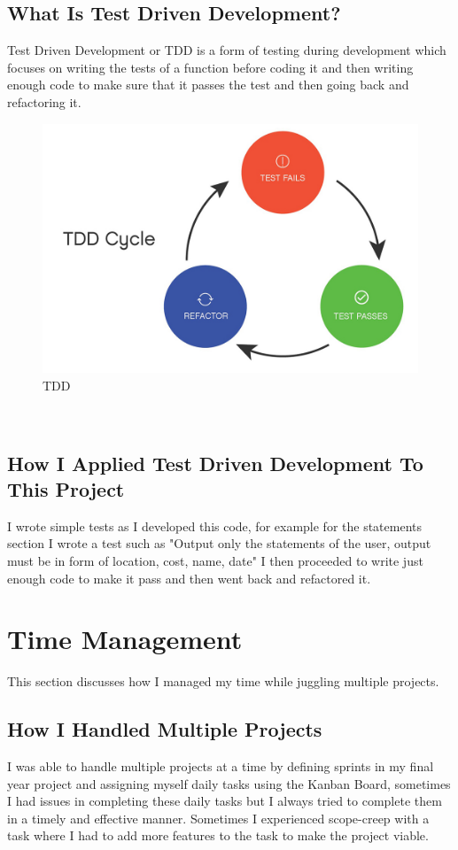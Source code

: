 \subsection{What Is Test Driven Development?}
Test Driven Development or TDD is a form of testing during development which focuses on writing the tests of a function before coding it and then writing enough code to make sure that it passes the test and then going back and refactoring it\cite{TDD}.
\begin{figure}[h!]
  \includegraphics[width=\textwidth]{img/tdd.jpg}
  \caption{TDD}
  \label{fig: Image of Test Driven Development}
\end{figure}
\\
\cite{TDDImage}
\subsection{How I Applied Test Driven Development To This Project}
I wrote simple tests as I developed this code, for example for the statements section I wrote a test such as "Output only the statements of the user, output must be in form of location, cost, name, date" I then proceeded to write just enough code to make it pass and then went back and refactored it.
\section{Time Management}
This section discusses how I managed my time while juggling multiple projects.
\subsection{How I Handled Multiple Projects}
I was able to handle multiple projects at a time by defining sprints in my final year project and assigning myself daily tasks using the Kanban Board, sometimes I had issues in completing these daily tasks but I always tried to complete them in a timely and effective manner.  Sometimes I experienced scope-creep with a task where I had to add more features to the task to make the project viable.
